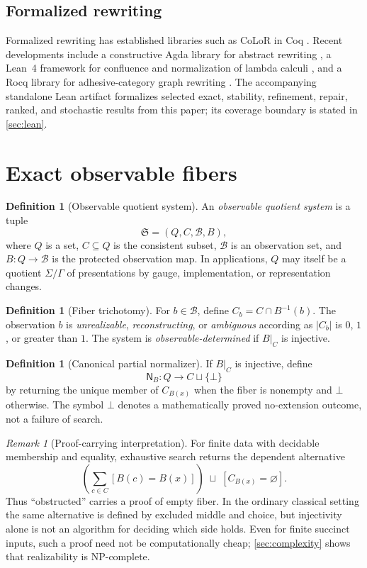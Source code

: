 \documentclass[11pt]{article}
\theoremstyle{definition}
\newtheorem{definition}[theorem]{Definition}
\theoremstyle{remark}
\newtheorem{remark}[theorem]{Remark}
\numberwithin{equation}{section}
\newcommand{\cB}{\mathcal B}
\begin{document}
\subsection{Formalized rewriting}

Formalized rewriting has established libraries such as CoLoR in Coq
\citep{BlanquiKoprowski2011}.  Recent developments include a constructive
Agda library for abstract rewriting \citep{ArklePolonsky2026}, a Lean~4
framework for confluence and normalization of lambda calculi
\citep{RamosEtAl2025}, and a Rocq library for adhesive-category graph
rewriting \citep{ArsacHarmerPous2025}.  The
accompanying standalone Lean artifact formalizes selected exact, stability,
refinement, repair, ranked, and stochastic results from this paper; its
coverage boundary is stated in \cref{sec:lean}.

\section{Exact observable fibers}\label{sec:exact}

\begin{definition}[Observable quotient system]
An \emph{observable quotient system} is a tuple
\[
 \mathfrak S=(Q,C,\cB,B),
\]
where $Q$ is a set, $C\subseteq Q$ is the consistent subset, $\cB$ is an observation set, and $B:Q\to\cB$ is the protected observation map.  In applications, $Q$ may itself be a quotient $\Sigma/\Gamma$ of presentations by gauge, implementation, or representation changes.
\end{definition}

\begin{definition}[Fiber trichotomy]
For $b\in\cB$, define $C_b=C\cap B^{-1}(b)$.  The observation $b$ is \emph{unrealizable}, \emph{reconstructing}, or \emph{ambiguous} according as $|C_b|$ is $0$, $1$, or greater than $1$.  The system is \emph{observable-determined} if $B|_C$ is injective.
\end{definition}

\begin{definition}[Canonical partial normalizer]
If $B|_C$ is injective, define
\[
 \mathsf N_B:Q\longrightarrow C\sqcup\{\bot\}
\]
by returning the unique member of $C_{B(x)}$ when the fiber is nonempty and $\bot$ otherwise.  The symbol $\bot$ denotes a mathematically proved no-extension outcome, not a failure of search.
\end{definition}

\begin{remark}[Proof-carrying interpretation]
For finite data with decidable membership and equality, exhaustive search
returns the dependent alternative
\[
 \left(\sum_{c\in C} [B(c)=B(x)]\right)
 \;\sqcup\;
 [C_{B(x)}=\varnothing].
\]
Thus \enquote{obstructed} carries a proof of empty fiber.  In the ordinary
classical setting the same alternative is defined by excluded middle and
choice, but injectivity alone is not an algorithm for deciding which side
holds.  Even for finite succinct inputs, such a proof need not be
computationally cheap; \cref{sec:complexity} shows that realizability is
NP-complete.
\end{remark}
\end{document}
